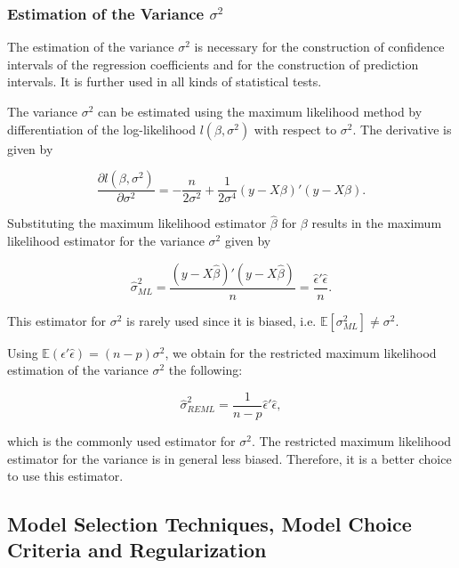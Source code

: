 \subsubsection{Estimation of the Variance $\sigma^2$}

The estimation of the variance $\sigma^2$ is necessary for the construction of confidence intervals of the regression coefficients and for the construction of prediction intervals. It is further used in all kinds of statistical tests. 


The variance $\sigma^2$ can be estimated using the maximum likelihood method by differentiation of the log-likelihood $l(\beta, \sigma^2)$ with respect to $\sigma^2$. The derivative is given by

$$\frac{\partial l(\beta, \sigma^2)}{\partial \sigma^2} = -\frac{n}{2\sigma^2} + \frac{1}{2\sigma^4}(y - X\beta)'(y - X\beta).  $$

Substituting the maximum likelihood estimator $\hat \beta$ for $\beta$ results in the maximum likelihood estimator for the variance $\sigma^2$ given by

\begin{equation} \label{sigma_ML}
	\hat \sigma_{ML}^2 = \frac{(y-X\hat\beta)'(y - X\hat\beta)}{n} = \frac{\hat\epsilon' \hat\epsilon}{n}.
\end{equation}

This estimator for $\sigma^2$ is rarely used since it is biased, i.e. $\mathbb{E}[\sigma^2_{ML}] \ne \sigma^2$. 


Using $\mathbb{E}(\hat\epsilon' \hat\epsilon) = (n - p)\sigma^2$, we obtain for the restricted maximum likelihood estimation of the variance $\sigma^2$ the following:

\begin{equation} \label{sigma_REML}
	\hat \sigma^2_{REML} = \frac{1}{n-p} \hat\epsilon' \hat\epsilon,
\end{equation}

which is the commonly used estimator for $\sigma^2$. The restricted maximum likelihood estimator for the variance is in general less biased. Therefore, it is a better choice to use this estimator.

\subsection{Model Selection Techniques, Model Choice Criteria and Regularization}

